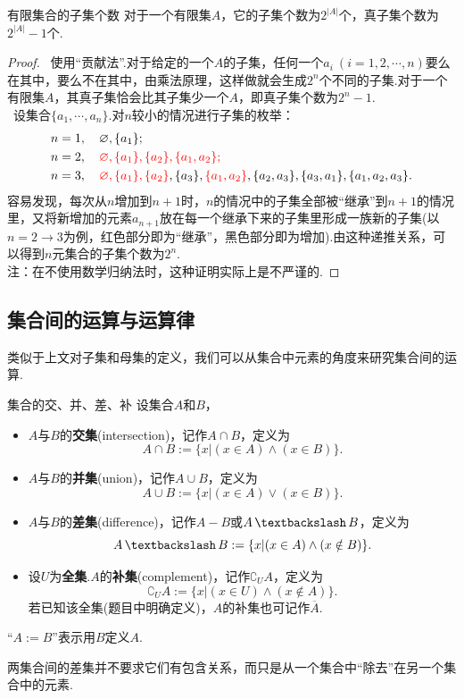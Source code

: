 \documentclass[lang=cn, zihao=5]{elegantbook}
\newcommand{\sw}[1]{\boxed{\text{解法 #1}} \ }
\DeclareMathOperator{\setjianfa}{\textbackslash}
\begin{document}
\begin{proposition}{有限集合的子集个数}
	对于一个有限集$A$，它的子集个数为$2^{|A|}$个，真子集个数为$2^{|A|}-1$个.
\end{proposition}
\begin{proof}
	\sw{一}使用“贡献法”.对于给定的一个$A$的子集，任何一个$a_i~(i=1,2,\cdots ,n)$要么在其中，要么不在其中，由乘法原理，这样做就会生成$2^n$个不同的子集.对于一个有限集$A$，其真子集恰会比其子集少一个$A$，即真子集个数为$2^n-1$. \\
	\sw{二}设集合$\{ a_1, \cdots ,a_n \}$.对$n$较小的情况进行子集的枚举：
	\begin{align*}
		n=1&,\quad \varnothing, \{ a_1 \}; \\
		n=2&,\quad \color{red} \varnothing, \{ a_1 \},\{ a_2 \},\{ a_1,a_2 \}; \color{black} \\
		n=3&,\quad \color{red} \varnothing, \{ a_1 \},\{ a_2 \}\color{black},\{ a_3 \},\color{red} \{a_1,a_2\} \color{black},\{ a_2,a_3 \},\{ a_3,a_1 \},\{ a_1,a_2,a_3 \}.
	\end{align*}
	容易发现，每次从$n$增加到$n+1$时，$n$的情况中的子集全部被“继承”到$n+1$的情况里，又将新增加的元素$a_{n+1}$放在每一个继承下来的子集里形成一族新的子集(以$n=2 \to 3$为例，红色部分即为“继承”，黑色部分即为增加).由这种递推关系，可以得到$n$元集合的子集个数为$2^n$. \\
	注：在不使用数学归纳法时，这种证明实际上是不严谨的.
\end{proof}

\subsection{集合间的运算与运算律}

类似于上文对子集和母集的定义，我们可以从集合中元素的角度来研究集合间的运算.

\begin{definition}{集合的交、并、差、补}
	设集合$A$和$B$，
	\begin{itemize}
		\item $A$与$B$的\textbf{交集}(intersection)，记作$A \cap B$，定义为$$A \cap B := \{ x|(x \in A) \wedge (x \in B) \}.$$
		\item $A$与$B$的\textbf{并集}(union)，记作$A \cup B$，定义为$$A \cup B := \{ x|(x \in A) \vee (x \in B) \}.$$
		\item $A$与$B$的\textbf{差集}(difference)，记作$A-B$或$A \setjianfa B$，定义为$$A \setjianfa B := \{ x|(x \in A) \wedge (x \notin B) \}.$$
		\item 设$U$为\textbf{全集}.$A$的\textbf{补集}(complement)，记作$\complement _{U}{A}$，定义为$$\complement _{U}{A} := \{ x|(x \in U) \wedge (x \notin A) \}.$$
	若已知该全集(题目中明确定义)，$A$的补集也可记作$\overline{A}$.
	\end{itemize}
\end{definition}
\begin{remark}
	“$A := B$”表示用$B$定义$A$.
\end{remark}
\begin{note}
	两集合间的差集并不要求它们有包含关系，而只是从一个集合中“除去”在另一个集合中的元素.
\end{note}
\end{document}
